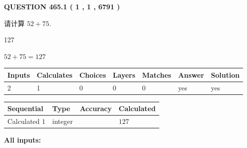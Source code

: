 \documentclass{ctexart}
\begin{document}
\vspace{0.2in}
  
{\textbf{\Large{QUESTION
465.1 
 ( 1 , 1 , 6791 )
}}}
  
  
 
请计算 $ %
52 +  %
75 $.
 
 
 
\noindent{}
 
 

127
 
 
\noindent{}
 
 

 
 
 
\noindent{}
 
 

$ %
52 +  %
75=   %
127$
 
 
\noindent{}
 
 

 
   
   
   
   
\noindent\begin{tabular}{|l|l|l|l|l|l|l|}
 \hline
Inputs & Calculates & Choices & Layers & Matches & Answer & Solution \\ \hline
 2  & 
 1  & 
 0
  & 
 0  & 
 0  & 
  yes & 
  yes 
  \\ \hline
 \end{tabular}
   
   
   
   
\noindent{}
   
   
  
  
\noindent\begin{tabular}{|l|l|l|l|}
\hline
 Sequential & Type & Accuracy & Calculated \\ 
\hline
 
 
  Calculated $  1 $ & integer &  & 
  $ 127 $ 
 \\  \hline  
 \end{tabular}
   
   
   
   
\noindent\vspace{0.1in}\hspace{-0.08in} {\textbf{\Large{All inputs: }}}
   
\end{document}
